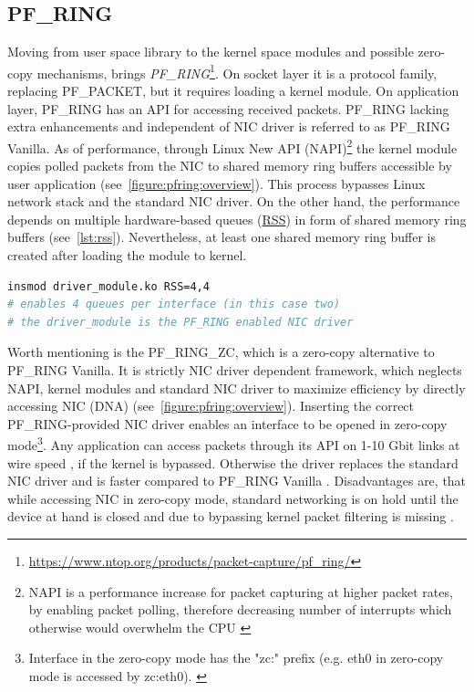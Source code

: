 \documentclass[12pt,a4paper,twoside]{report}
\begin{document}
		\subsection{PF\_RING} \label{analysis:mechs:pfring}
			Moving from user space library to the kernel space modules and possible zero-copy mechanisms, brings \emph{PF\_RING}\footnote{\url{https://www.ntop.org/products/packet-capture/pf_ring/}}. On socket layer it is a protocol family, replacing PF\_PACKET, but it requires loading a kernel module. On application layer, PF\_RING has an API for accessing received packets. PF\_RING lacking extra enhancements and independent of NIC driver is referred to as PF\_RING Vanilla. As of performance, through Linux New API (NAPI)\footnote{NAPI is a performance increase for packet capturing at higher packet rates, by enabling packet polling, therefore decreasing number of interrupts which otherwise would overwhelm the CPU \cite{web:linux:napi}} the kernel module copies polled packets from the NIC to shared memory ring buffers accessible by user application (see~\autoref{figure:pfring:overview})\cite{web:pfring:vanilla}. This process bypasses Linux network stack and the standard NIC driver. On the other hand, the performance depends on multiple hardware-based queues (\hyperref[analysis:mechs:scapy_rss]{RSS}) in form of shared memory ring buffers (see~\autoref{lst:rss}). Nevertheless, at least one shared memory ring buffer is created after loading the module to kernel. \cite{docs:pfring:vanilla}
			\begin{lstlisting}[language=bash, caption=Enabling RSS \cite{docs:pfring:rss}, label=lst:rss]
insmod driver_module.ko RSS=4,4
# enables 4 queues per interface (in this case two)
# the driver_module is the PF_RING enabled NIC driver
			\end{lstlisting}
			\par
			Worth mentioning is the PF\_RING\_ZC, which is a zero-copy alternative to PF\_RING Vanilla. It is strictly NIC driver dependent framework, which neglects NAPI, kernel modules and standard NIC driver to maximize efficiency by directly accessing NIC (DNA) (see~\autoref{figure:pfring:overview}). Inserting the correct PF\_RING-provided NIC driver enables an interface to be opened in zero-copy mode\footnote{Interface in the zero-copy mode has the "zc:" prefix (e.g. eth0 in zero-copy mode is accessed by zc:eth0). \cite{docs:pfring:zero}}. Any application can access packets through its API on 1-10 Gbit links at wire speed \cite{docs:pfring:zero}, if the kernel is bypassed. Otherwise the driver replaces the standard NIC driver and is faster compared to PF\_RING Vanilla \cite{web:pfring:zero}. Disadvantages are, that while accessing NIC in zero-copy mode, standard networking is on hold until the device at hand is closed \cite{web:pfring:zero} and due to bypassing kernel packet filtering is missing \cite{docs:pfring:zero}.\par
\end{document}

